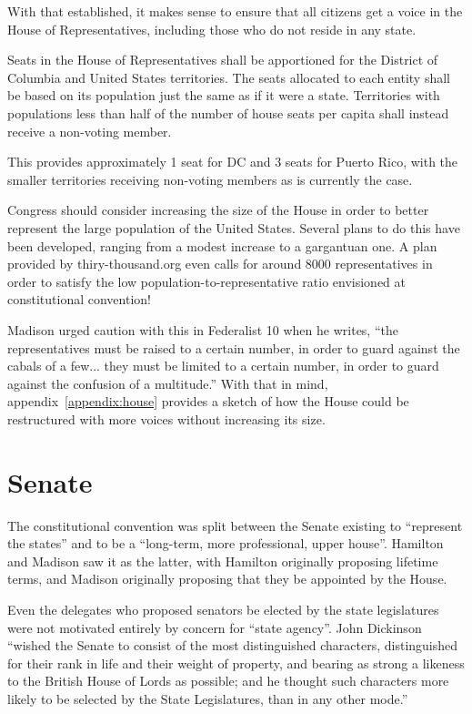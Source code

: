 \documentclass{article}
\newcommand{\quotes}[1]{``#1''}
\begin{document}
With that established, it makes sense to ensure that all citizens get a voice in the House of Representatives, including those who do not reside in any state.

\begin{quoting}
Seats in the House of Representatives shall be apportioned for the District of Columbia and United States territories. The seats allocated to each entity shall be based on its population just the same as if it were a state. Territories with populations less than half of the number of house seats per capita shall instead receive a non-voting member.
\end{quoting}

This provides approximately 1 seat for DC and 3 seats for Puerto Rico, with the smaller territories receiving non-voting members as is currently the case.

Congress should consider increasing the size of the House in order to better represent the large population of the United States. Several plans to do this have been developed, ranging from a modest increase to a gargantuan one\cite{Allen}. A plan provided by thiry-thousand.org even calls for around 8000 representatives in order to satisfy the low population-to-representative ratio envisioned at constitutional convention\cite{30000}!

Madison urged caution with this in Federalist 10 when he writes, \quotes{the representatives must be raised to a certain number, in order to guard against the cabals of a few... they must be limited to a certain number, in order to guard against the confusion of a multitude.}\cite{Federalist10} With that in mind, appendix~\ref{appendix:house} provides a sketch of how the House could be restructured with more voices without increasing its size.

\section{Senate}
\label{section:Senate}

The constitutional convention was split between the Senate existing to \quotes{represent the states} and to be a \quotes{long-term, more professional, upper house}. Hamilton and Madison saw it as the latter, with Hamilton originally proposing lifetime terms, and Madison originally proposing that they be appointed by the House.

Even the delegates who proposed senators be elected by the state legislatures were not motivated entirely by concern for \quotes{state agency}. John Dickinson \quotes{wished the Senate to consist of the most distinguished characters, distinguished for their rank in life and their weight of property, and bearing as strong a likeness to the British House of Lords as possible; and he thought such characters more likely to be selected by the State Legislatures, than in any other mode.}\cite{Madison}
\end{document}
